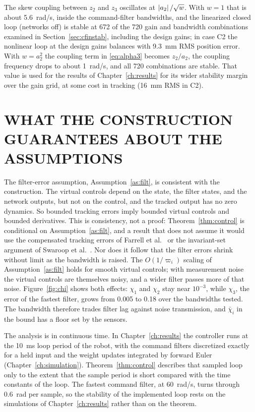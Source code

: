 \begin{remark}\label{rem:weight}
The skew coupling between $z_2$ and $z_3$ oscillates at
$\left\lvert a_2 \right\rvert/\sqrt{w}$. With $w=1$ that is about \SI{5.6}{rad/s}, inside the
command-filter bandwidths, and the linearized closed loop (networks off) is
stable at 672 of the 720 gain and bandwidth combinations examined in
Section~\ref{sec:cfinstab}, including the design gains; in case C2 the
nonlinear loop at the design gains balances with \SI{9.3}{mm} RMS position
error. With $w=a_2^2$ the coupling term in \eqref{eq:alpha3} becomes $z_2/a_2$,
the coupling frequency drops to about \SI{1}{rad/s}, and all 720 combinations
are stable. That value is used for the results of Chapter~\ref{ch:results} for
its wider stability margin over the gain grid, at some cost in tracking
(\SI{16}{mm} RMS in C2).
\end{remark}

\section{WHAT THE CONSTRUCTION GUARANTEES ABOUT THE ASSUMPTIONS}
\label{sec:assumptions}

The filter-error assumption, Assumption~\ref{as:filt}, is consistent with the
construction. The virtual controls depend on the state, the filter states, and
the network outputs, but not on the control, and the tracked output has no
zero dynamics. So bounded tracking errors imply bounded virtual controls and
bounded derivatives. This is consistency, not a proof:
Theorem~\ref{thm:control} is conditional on Assumption~\ref{as:filt}, and a
result that does not assume it would use the compensated tracking errors of
Farrell et al.\ \cite{farrell2009command} or the invariant-set argument of
Swaroop et al.\ \cite{swaroop2000dsc}. Nor does it follow that the filter
errors shrink without limit as the bandwidth is raised. The $O(1/\varpi_i)$ scaling of
Assumption~\ref{as:filt} holds for smooth virtual controls; with measurement
noise the virtual controls are themselves noisy, and a wider filter passes more
of that noise. Figure~\ref{fig:chi} shows both effects: $\chi_1$ and $\chi_2$
stay near $10^{-3}$, while $\chi_3$, the error of the fastest filter, grows
from \num{0.005} to \num{0.18} over the bandwidths tested. The bandwidth
therefore trades filter lag against noise transmission, and $\bar\chi_i$ in the
bound has a floor set by the sensors.

The analysis is in continuous time. In Chapter~\ref{ch:results} the
controller runs at the \SI{10}{ms} loop period of the robot,
with the command filters discretized exactly for a held input and the weight
updates integrated by forward Euler (Chapter~\ref{ch:simulation}).
Theorem~\ref{thm:control} describes that sampled loop only to the extent that
the sample period is short compared with the time constants of the loop. The
fastest command filter, at \SI{60}{rad/s}, turns through 0.6~rad per sample, so
the stability of the implemented loop rests on the simulations of
Chapter~\ref{ch:results} rather than on the theorem.

